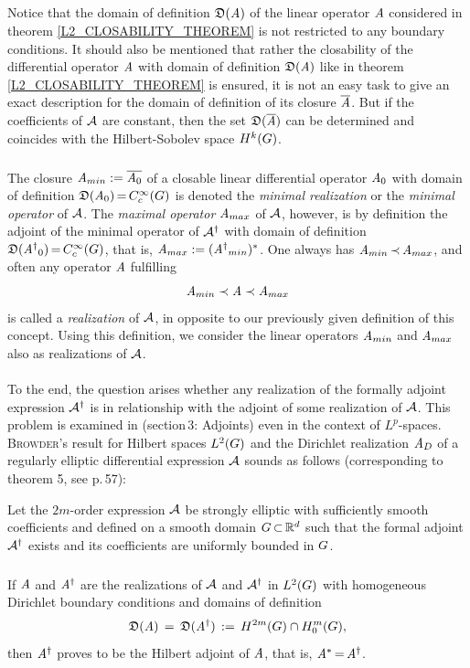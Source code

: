 \documentclass[11pt,twoside]{article}
\begin{document}
\subparagraph{} %
Notice that the domain of definition $\mathfrak{D}(\mathit{A})$
of the linear operator $\mathit{A}$ considered in theorem \ref{L2_CLOSABILITY_THEOREM}
is not restricted to any boundary conditions.
It should also be mentioned that
rather the closability of the differential operator $\mathit{A}$
with domain of definition $\mathfrak{D}(\mathit{A})$
like in theorem \ref{L2_CLOSABILITY_THEOREM} is ensured,
it is not an easy task to give an exact description
for the domain of definition of its closure $\overline{\mathit{A}}$.
But if the coefficients of ${\mathcal{A}}$ are constant,
then the set $\mathfrak{D}(\overline{\mathit{A}} )$ can be determined
and coincides with the Hilbert-Sobolev space $H^k(G)$.

\subparagraph{} %
The closure $\mathit{A}_{min} := \overline{\mathit{A}_0}$
of a closable linear differential operator $\mathit{A}_0$
with domain of definition $\mathfrak{D}(\mathit{A}_0) {\,=\,} C_c^{\infty}(G)$
is denoted the \textit{minimal realization}
or the \textit{minimal operator} of ${\mathcal{A}}$.
The \textit{maximal operator} $\mathit{A}_{max}$ of ${\mathcal{A}}$,
however,
is by definition the adjoint of the minimal operator of ${\mathcal{A}}^{\dag}$
with domain of definition $\mathfrak{D}({\mathit{A}^{\dag}}_0) {\,=\,} C_c^{\infty}(G)$,
that is,
$\mathit{A}_{max} := ({\mathit{A}^{\dag}}_{min})^*$.
One always has $\mathit{A}_{min} \, {\prec} \, \mathit{A}_{max}$,
and often any operator $\mathit{A}$ fulfilling
\[
\mathit{A}_{min} \prec \mathit{A} \prec \mathit{A}_{max}
\]
is called a \textit{realization} of ${\mathcal{A}}$,
in opposite to our previously given definition of this concept.
Using this definition,
we consider the linear operators $\mathit{A}_{min}$ and $\mathit{A}_{max}$
also as realizations of ${\mathcal{A}}$.

\paragraph{} %
To the end,
the question arises whether any realization
of the formally adjoint expression ${\mathcal{A}}^{\dag}$ is in relationship
with the adjoint of some realization of ${\mathcal{A}}$.
This problem is examined in \cite{Br2} (section\,3: Adjoints)
even in the context of $L^p$-spaces.
\textsc{Browder}'s result for Hilbert spaces $L^2(G)$
and the Dirichlet realization $\mathit{A}_D$
of a regularly elliptic differential expression ${\mathcal{A}}$ sounds as follows
(corresponding to theorem 5, see p.\,57):

\begin{theorem}
Let the $2m$-order expression ${\mathcal{A}}$ be strongly elliptic
with sufficiently smooth coefficients
and defined on a smooth domain $G {\,\subset\,} {\mathbb{R}}^d$
such that the formal adjoint ${\mathcal{A}}^{\dag}$ exists and its coefficients
are uniformly bounded in $G$.

\subparagraph{} %
If $\mathit{A}$ and $\mathit{A}^{\dag}$ are the realizations of ${\mathcal{A}}$ and ${\mathcal{A}}^{\dag}$
in $L^2(G)$ with homo\-geneous Dirichlet boundary conditions
and domains of definition
\[
\mathfrak{D}(\mathit{A}) \,=\, \mathfrak{D}({\mathit{A}}^{\dag}) \,:=\, H^{2m}(G) \cap H_0^{m}(G),
\]
then $\mathit{A}^{\dag}$ proves to be the Hilbert adjoint of ${\mathit{A}}$,
that is,
${\mathit{A}}^* {\,=\,} \mathit{A}^{\dag}$.
\end{theorem}
\end{document}
